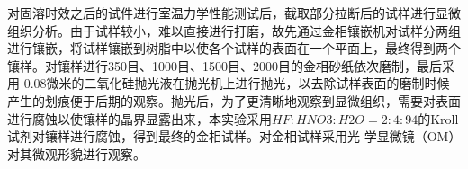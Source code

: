 对固溶时效之后的试件进行室温力学性能测试后，截取部分拉断后的试样进行显微组织分析。由于试样较小，难以直接进行打磨，故先通过金相镶嵌机对试样分两组进行镶嵌，将试样镶嵌到树脂中以使各个试样的表面在一个平面上，最终得到两个镶样。对镶样进行350目、1000目、1500目、2000目的金相砂纸依次磨制，最后采用 0.08微米的二氧化硅抛光液在抛光机上进行抛光，以去除试样表面的磨制时候产生的划痕便于后期的观察。抛光后，为了更清晰地观察到显微组织，需要对表面进行腐蚀以使镶样的晶界显露出来，本实验采用$ HF:HNO3:H2O=2:4:94 $的Kroll试剂对镶样进行腐蚀，得到最终的金相试样。对金相试样采用光 学显微镜（OM）对其微观形貌进行观察。
\begin{figure}[htbp]
	\centering
\end{figure}
